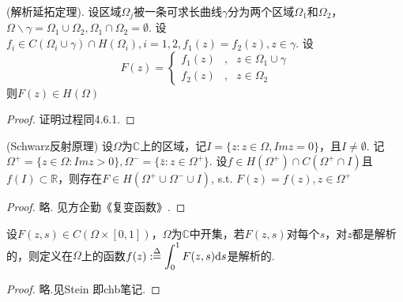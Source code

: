 \begin{theorem}
	\color{blue}
	(解析延拓定理).
	\color{black}
	设区域$\displaystyle{\Omega_j}$被一条可求长曲线$\displaystyle{\gamma}$分为两个区域$\displaystyle{\Omega_1}$和$\displaystyle{\Omega_2}$，$\displaystyle{\Omega {\backslash} \gamma = \Omega_1 \cup \Omega_2, \Omega_1 \cap \Omega_2 = \emptyset}$. 设$\displaystyle{f_i \in C(\Omega_i \cup \gamma) \cap H(\Omega_i), i=1,2, f_1(z) = f_2(z), z \in \gamma}$.
	设
	\begin{equation*}
	F(z) = \left\{
	\begin{aligned}
	f_1(z)& , & z \in \Omega_1 \cup \gamma \\ 
	f_2(z) & , & z \in \Omega_2
	\end{aligned}
	\right.
	\end{equation*}
	则$\displaystyle{F(z) \in H(\Omega)}$
\end{theorem}
\begin{proof}
	证明过程同4.6.1.
\end{proof}

\begin{theorem}
	\color{blue}
	({\rm Schwarz}反射原理)
	\color{black}
	设$\displaystyle{\Omega}$为$\displaystyle{\mathbb{C}}$上的区域，记$\displaystyle{I = \{ z: z \in \Omega, Imz = 0\}}$，且$\displaystyle{I \neq \emptyset}$. 记$\displaystyle{\Omega^+ = \{ z \in \Omega : Im z >0\} ,  \Omega^- = \{ \bar{z} : z \in \Omega^+ \}}$. 设$\displaystyle{f \in H(\Omega^+) \cap C(\Omega ^ + \cap I)}$且$\displaystyle{f(I) \subset \mathbb{R}}$，则存在$\displaystyle{F \in H(\Omega^+ \cup \Omega^- \cup I)}$, s.t. $\displaystyle{F(z) = f(z), z \in \Omega^+}$
\end{theorem}
\begin{proof}
	略. 见方企勤《复变函数》.
\end{proof}

\begin{theorem}
	设$\displaystyle{F(z, s) \in C(\Omega \times [0,1]) }$，$\displaystyle{\Omega}$为$\displaystyle{\mathbb{C}}$中开集，若$\displaystyle{F(z,s)}$对每个$\displaystyle{s}$，对$\displaystyle{z}$都是解析的，则定义在$\displaystyle{\Omega}$上的函数$\displaystyle{f(z):\overset{\Delta}{=} \int_0^1 F(z,s) \mathrm{d}s}$是解析的.
\end{theorem}
\begin{proof}
	略.见{\rm Stein} 即chb笔记.
\end{proof}

